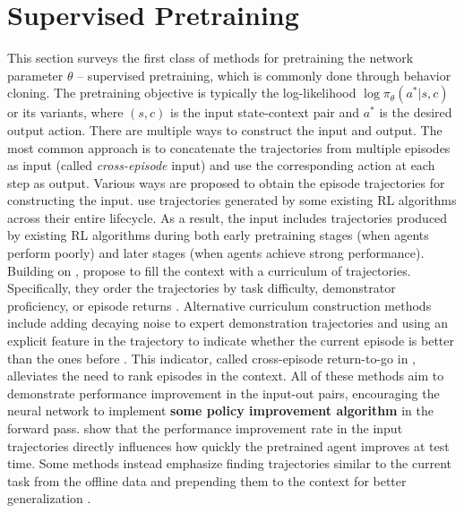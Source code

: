 \documentclass{article}
\newcommand{\tb}[1]{\textbf{#1}}
\begin{document}
\section{Supervised Pretraining} \label{sec: offline ctx based methods}
This section surveys the first class of methods for pretraining the network parameter $\theta$ -- supervised pretraining,
which is commonly done through behavior cloning.
The pretraining objective is typically the log-likelihood $\log \pi_\theta(a^* | s, c)$ or its variants,
where $(s, c)$ is the input state-context pair and $a^*$ is the desired
output action.
There are multiple ways to construct the input and output.
The most common approach is to concatenate the trajectories from multiple episodes as input (called \emph{cross-episode} input)
and use the corresponding action at each step as output.
Various ways are proposed to obtain the episode trajectories for constructing the input.
\citet{laskinContextReinforcementLearning2022} use trajectories generated by some existing RL algorithms across their entire lifecycle. As a result, the input includes trajectories produced by existing RL algorithms during both early pretraining stages (when agents perform poorly) and later stages (when agents achieve strong performance).
Building on \citet{laskinContextReinforcementLearning2022}, \citet{shiCrossEpisodicCurriculumTransformer2023} propose to fill the context with a curriculum of trajectories.
Specifically, they order the trajectories by task difficulty,
demonstrator proficiency,
or episode returns \citep{huangContextDecisionTransformer2024,huangDecisionMambaReinforcement2024,liuEmergentAgenticTransformer2023}.
Alternative curriculum construction methods include adding decaying noise to expert demonstration trajectories \citep{zismanEmergenceContextReinforcement2023} and using an explicit feature in the trajectory to indicate
whether the current episode is better than the ones before \citep{daiContextExplorationExploitationReinforcement2024}.
This indicator, called cross-episode return-to-go in \citet{daiContextExplorationExploitationReinforcement2024}, alleviates the need to rank episodes in the context.
All of these methods aim to demonstrate performance improvement in the input-out pairs, encouraging the neural network to implement \tb{some policy improvement algorithm} in the forward pass.
\citet{kirschGeneralPurposeContextLearning2023} show that the performance improvement rate in the input trajectories directly influences how quickly the pretrained agent improves at test time.
Some methods instead emphasize finding trajectories similar to the current task from the offline data and prepending them to the context for better generalization \citep{xuPromptingDecisionTransformer2022,wangHierarchicalPromptDecision2024}.
\end{document}
